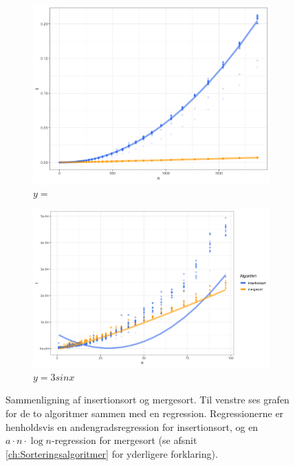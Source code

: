 \begin{figure} \centering
	\begin{subfigure}[b]{0.45\textwidth}
		\centering
		\includegraphics[width=\textwidth]{../img/toAlgoritmer.png}
		\caption{$y=$}
		\label{fig:regressioner}
	\end{subfigure}
	\hfill
	\begin{subfigure}[b]{0.45\textwidth}
		\centering
		\includegraphics[width=\textwidth]{../img/toAlgoritmerZoomed}
		\caption{$y=3sinx$}
		\label{fig:residualplot}
	\end{subfigure}
	\caption{Sammenligning af insertionsort og mergesort. Til venstre ses grafen for de to algoritmer sammen med en regression. Regressionerne er henholdsvis en andengradsregression for insertionsort, og en $a \cdot n \cdot \log n$-regression for mergesort (se afsnit \ref{ch:Sorteringsalgoritmer} for yderligere forklaring).}
	\label{fig:plot - to algoritmer}
\end{figure}

